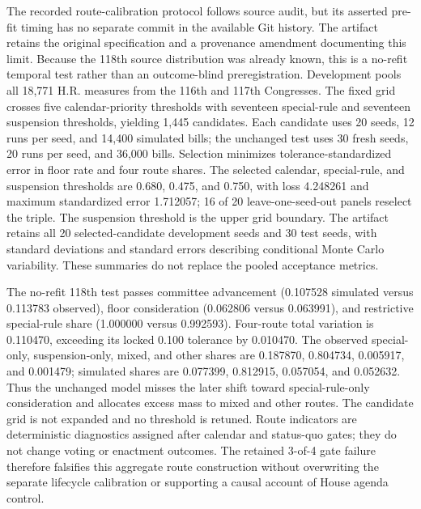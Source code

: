 \documentclass[manuscript]{acmart}
\begin{document}
The recorded route-calibration protocol follows source audit, but its asserted pre-fit timing has no separate commit in the available Git history. The artifact retains the original specification and a provenance amendment documenting this limit. Because the 118th source distribution was already known, this is a no-refit temporal test rather than an outcome-blind preregistration. Development pools all 18,771 H.R. measures from the 116th and 117th Congresses. The fixed grid crosses five calendar-priority thresholds with seventeen special-rule and seventeen suspension thresholds, yielding 1,445 candidates. Each candidate uses 20 seeds, 12 runs per seed, and 14,400 simulated bills; the unchanged test uses 30 fresh seeds, 20 runs per seed, and 36,000 bills. Selection minimizes tolerance-standardized error in floor rate and four route shares. The selected calendar, special-rule, and suspension thresholds are 0.680, 0.475, and 0.750, with loss 4.248261 and maximum standardized error 1.712057; 16 of 20 leave-one-seed-out panels reselect the triple. The suspension threshold is the upper grid boundary. The artifact retains all 20 selected-candidate development seeds and 30 test seeds, with standard deviations and standard errors describing conditional Monte Carlo variability. These summaries do not replace the pooled acceptance metrics.

The no-refit 118th test passes committee advancement (0.107528 simulated versus 0.113783 observed), floor consideration (0.062806 versus 0.063991), and restrictive special-rule share (1.000000 versus 0.992593). Four-route total variation is 0.110470, exceeding its locked 0.100 tolerance by 0.010470. The observed special-only, suspension-only, mixed, and other shares are 0.187870, 0.804734, 0.005917, and 0.001479; simulated shares are 0.077399, 0.812915, 0.057054, and 0.052632. Thus the unchanged model misses the later shift toward special-rule-only consideration and allocates excess mass to mixed and other routes. The candidate grid is not expanded and no threshold is retuned. Route indicators are deterministic diagnostics assigned after calendar and status-quo gates; they do not change voting or enactment outcomes. The retained 3-of-4 gate failure therefore falsifies this aggregate route construction without overwriting the separate lifecycle calibration or supporting a causal account of House agenda control.
\end{document}
